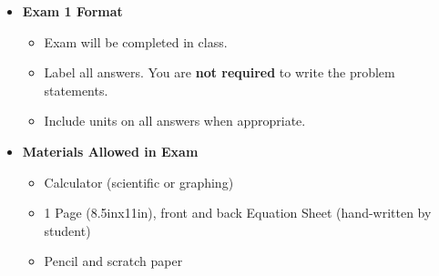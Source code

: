 \documentclass[11pt]{article}
\newcommand{\EXAMNUM}{1\hspace{0mm}}
\begin{document}
\begin{itemize}
             	\item  \textbf{\Large Exam \EXAMNUM \hspace{1mm} Format}
\begin{itemize}
		
			\item Exam will be completed in class.
			
			\item Label all answers. You are {\bf not required} to write the problem statements.
			\item Include units on all answers when appropriate.  
\end{itemize}


\vspace{5mm}		

		\item  \textbf{ Materials Allowed in Exam}

	\begin{itemize}

		\item  Calculator (scientific or graphing)
	
		\item  1 Page (8.5inx11in), front and back Equation Sheet (hand-written by student)
			
		\item  Pencil and scratch paper
			

\end{itemize}
\end{itemize}
\end{document}

